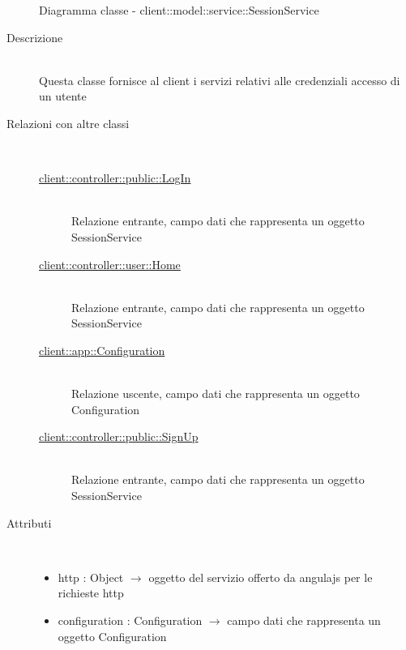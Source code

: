 \begin{figure}[H]
	\centering
	\caption{Diagramma classe - client::model::service::SessionService}
\end{figure}\begin{description}
\item[Descrizione] \hfill \\
Questa classe fornisce al client i servizi relativi  alle credenziali accesso di un utente
\item[Relazioni con altre classi] \hfill \\
\vspace{-7mm}
\begin{description}
	\item[\hyperlink{client::controller::public::LogIn}{client::controller::public::LogIn}] \hfill \\
	Relazione entrante, campo dati che rappresenta un oggetto SessionService
	\item[\hyperlink{client::controller::user::Home}{client::controller::user::Home}] \hfill \\
	Relazione entrante, campo dati che rappresenta un oggetto SessionService
	\item[\hyperlink{client::app::Configuration}{client::app::Configuration}] \hfill \\
	Relazione uscente, campo dati che rappresenta un oggetto Configuration
	\item[\hyperlink{client::controller::public::SignUp}{client::controller::public::SignUp}] \hfill \\
	Relazione entrante, campo dati che rappresenta un oggetto SessionService
\end{description}

\item[Attributi] \hfill \\
\vspace{-7mm}
\begin{itemize}
	\item http : Object $\rightarrow$ oggetto del servizio offerto da angulajs per le richieste http
	\item configuration : Configuration $\rightarrow$ campo dati che rappresenta un oggetto Configuration
\end{itemize}


\end{description}
